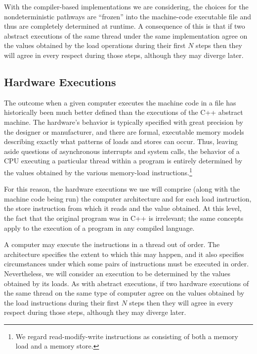 \documentclass[10]{article}
\begin{document}
With the compiler-based implementations we are considering,
the choices for the nondeterministic pathways are ``frozen'' into the
machine-code executable file and thus are completely determined
at runtime.
A consequence of this is that if two abstract executions of the same
thread under the same implementation agree on the values obtained by
the load operations during their first $N$ steps then they will agree
in every respect during those steps, although they may diverge later.

\subsection{Hardware Executions}
\label{sec:Hardware Executions}

The outcome when a given computer executes the machine code in a file
has historically been much better defined than the executions of the
C++ abstract machine.
The hardware's behavior is typically specified with great precision by
the designer or manufacturer, and there are formal, executable memory models
describing exactly what patterns of loads and stores can occur.
Thus, leaving aside questions of asynchronous interrupts and system
calls, the behavior of a CPU executing a particular thread within a
program is entirely determined by the values obtained by the various
memory-load instructions.\footnote{
	We regard read-modify-write instructions as consisting of both a
	memory load and a memory store.}

For this reason, the hardware executions we use will comprise (along
with the machine code being run) the computer architecture and for each
load instruction, the store instruction from which it reads and the
value obtained.
At this level, the fact that the original program was in C++ is
irrelevant; the same concepts apply to the execution of a program in
any compiled language.

A computer may execute the instructions in a thread out of order.
The architecture specifies the extent to which this may happen, and it
also specifies circumstances under which some pairs of instructions
must be executed in order.
Nevertheless, we will consider an execution to be determined by the
values obtained by its loads.
As with abstract executions, if two hardware executions of the same
thread on the same type of computer agree on the values obtained by
the load instructions during their first $N$ steps then they will
agree in every respect during those steps, although they may diverge
later.
\end{document}
